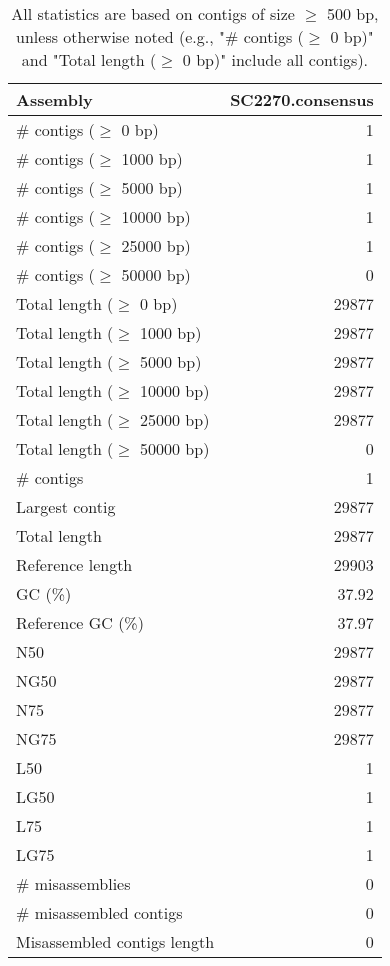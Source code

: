 \documentclass[12pt,a4paper]{article}
\begin{document}
\begin{table}[ht]
\begin{center}
\caption{All statistics are based on contigs of size $\geq$ 500 bp, unless otherwise noted (e.g., "\# contigs ($\geq$ 0 bp)" and "Total length ($\geq$ 0 bp)" include all contigs).}
\begin{tabular}{|l*{1}{|r}|}
\hline
Assembly & SC2270.consensus \\ \hline
\# contigs ($\geq$ 0 bp) & 1 \\ \hline
\# contigs ($\geq$ 1000 bp) & 1 \\ \hline
\# contigs ($\geq$ 5000 bp) & 1 \\ \hline
\# contigs ($\geq$ 10000 bp) & 1 \\ \hline
\# contigs ($\geq$ 25000 bp) & 1 \\ \hline
\# contigs ($\geq$ 50000 bp) & 0 \\ \hline
Total length ($\geq$ 0 bp) & 29877 \\ \hline
Total length ($\geq$ 1000 bp) & 29877 \\ \hline
Total length ($\geq$ 5000 bp) & 29877 \\ \hline
Total length ($\geq$ 10000 bp) & 29877 \\ \hline
Total length ($\geq$ 25000 bp) & 29877 \\ \hline
Total length ($\geq$ 50000 bp) & 0 \\ \hline
\# contigs & 1 \\ \hline
Largest contig & 29877 \\ \hline
Total length & 29877 \\ \hline
Reference length & 29903 \\ \hline
GC (\%) & 37.92 \\ \hline
Reference GC (\%) & 37.97 \\ \hline
N50 & 29877 \\ \hline
NG50 & 29877 \\ \hline
N75 & 29877 \\ \hline
NG75 & 29877 \\ \hline
L50 & 1 \\ \hline
LG50 & 1 \\ \hline
L75 & 1 \\ \hline
LG75 & 1 \\ \hline
\# misassemblies & 0 \\ \hline
\# misassembled contigs & 0 \\ \hline
Misassembled contigs length & 0 \\ \hline

\end{tabular}
\end{center}
\end{table}
\end{document}
